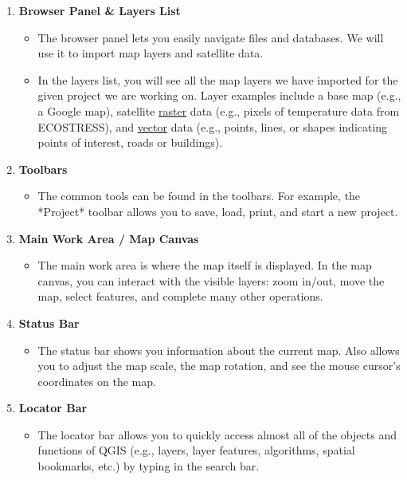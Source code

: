 \documentclass[oneside,a4paper,11pt,explicit]{book}
\begin{document}
\begin{enumerate}
	\item \textbf{Browser Panel \& Layers List}
	\begin{itemize}
		\item The browser panel lets you easily navigate files and databases. We will use it to import map layers and satellite data.
		\item In the layers list, you will see all the map layers we have imported for the given project we are working on. Layer examples include a base map (e.g., a Google map), satellite \href{https://en.wikipedia.org/wiki/Raster_graphics}{raster} data (e.g., pixels of temperature data from ECOSTRESS), and \href{https://en.wikipedia.org/wiki/Vector_graphics}{vector} data (e.g., points, lines, or shapes indicating points of interest, roads or buildings).
	\end{itemize}
	\item \textbf{Toolbars}
	\begin{itemize}
		\item The common tools can be found in the toolbars. For example, the *Project* toolbar allows you to save, load, print, and start a new project.
	\end{itemize}
	\item \textbf{Main Work Area / Map Canvas}
	\begin{itemize}
		\item The main work area is where the map itself is displayed. In the map canvas, you can interact with the visible layers: zoom in/out, move the map, select features, and complete many other operations.
	\end{itemize}
	\item \textbf{Status Bar}
	\begin{itemize}
		\item The status bar shows you information about the current map. Also allows you to adjust the map scale, the map rotation, and see the mouse cursor's coordinates on the map.
	\end{itemize}
	\item \textbf{Locator Bar}
	\begin{itemize}
		\item The locator bar allows you to quickly access almost all of the objects and functions of QGIS (e.g., layers, layer features, algorithms, spatial bookmarks, etc.) by typing in the search bar.
	\end{itemize}
\end{enumerate}
\end{document}
